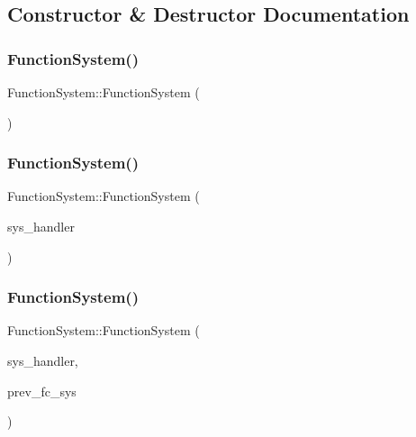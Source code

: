 \subsection{Constructor \& Destructor Documentation}
\mbox{\label{classFunctionSystem_a66e3b5e5118f00a940c3e4a2f138c9c6}} 
\subsubsection{\texorpdfstring{Function\+System()}{FunctionSystem()}\hspace{0.1cm}{\footnotesize\ttfamily [1/3]}}
{\footnotesize\ttfamily Function\+System\+::\+Function\+System (\begin{DoxyParamCaption}{ }\end{DoxyParamCaption})}

\mbox{\label{classFunctionSystem_a8c2420b3c21af6e84bdf0ef23ccdb0a6}} 
\subsubsection{\texorpdfstring{Function\+System()}{FunctionSystem()}\hspace{0.1cm}{\footnotesize\ttfamily [2/3]}}
{\footnotesize\ttfamily Function\+System\+::\+Function\+System (\begin{DoxyParamCaption}\item[{\hyperlink{classSystemHandler}{System\+Handler} $\ast$}]{sys\+\_\+handler }\end{DoxyParamCaption})}

\mbox{\label{classFunctionSystem_aa847d30455d0868179326505ec6384cd}} 
\subsubsection{\texorpdfstring{Function\+System()}{FunctionSystem()}\hspace{0.1cm}{\footnotesize\ttfamily [3/3]}}
{\footnotesize\ttfamily Function\+System\+::\+Function\+System (\begin{DoxyParamCaption}\item[{\hyperlink{classSystemHandler}{System\+Handler} $\ast$}]{sys\+\_\+handler,  }\item[{\hyperlink{classFunctionSystem}{Function\+System} $\ast$}]{prev\+\_\+fc\+\_\+sys }\end{DoxyParamCaption})}

